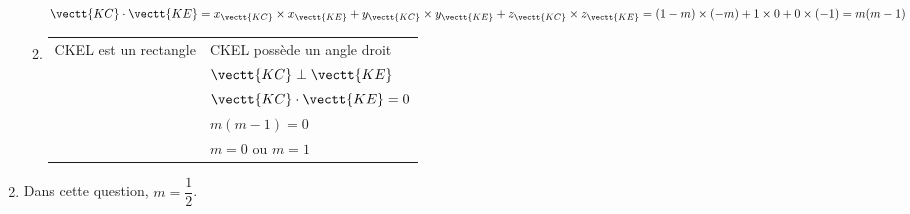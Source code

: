 \begin{enumerate}[resume]
\begin{enumerate}
$\vectt{KC} \cdot \vectt{KE} 
= x_{\vectt{KC}}\times x_{\vectt{KE}} + y_{\vectt{KC}}\times y_{\vectt{KE}}  + z_{\vectt{KC}}\times z_{\vectt{KE}} 
= (1-m)\times (-m) + 1 \times 0 + 0 \times (-1)
= m(m - 1)$	
		
		\item
\begin{tabular}[t]{@{} l @{ si, et seulement si, } l}
CKEL est un rectangle & CKEL possède un angle droit\\
&$\vectt{KC} \perp \vectt{KE}$\\
& $\vectt{KC} \cdot \vectt{KE}=0$\\
& $m(m-1)=0$\\
&$m = 0$ ou $m = 1$
\end{tabular}	

\end{enumerate}
\item Dans cette question, $m = \dfrac12$. 


\end{enumerate}
